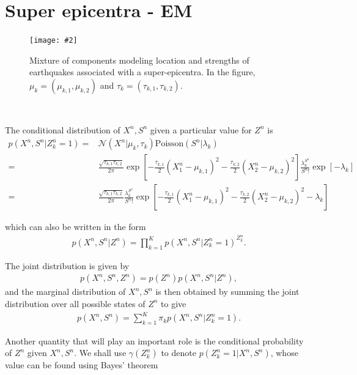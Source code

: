 \documentclass[11pt]{extarticle}
\newcommand{\N}{\mathcal{N}}
\newcommand{\0}{\mathbf{0}}
\renewcommand{\(}{\left(}
\renewcommand{\)}{\right)}
\theoremstyle{definition}
\newcommand{\image}[3]{
	\begin{figure}[!ht]
		\centering
	    \texttt{[image: \#2]}
		\caption{#3}
		\label{fig:#2}
	\end{figure}
}
\begin{document}
\newpage
\section{Super epicentra - EM}
\image{0.5}{Q2_2}{Mixture of components modeling location and strengths of earthquakes associated with a super-epicentra. In the figure, $\mu_{k} = (\mu_{k,1}, \mu_{k,2})$ and $\tau_{k} = (\tau_{k,1}, \tau_{k,2})$.}
\noindent{} \\
\par The conditional distribution of $X^{n}, S^{n}$ given a particular value for $Z^{n}$ is
\begin{align*}
	p(X^{n}, S^{n} \vert Z^{n}_{k}=1) =& \N(X^{n} \vert \mu_{k}, \tau_{k}) \mathrm{Poisson}(S^{n} \vert \lambda_{k}) \\ 
	=& \frac{\sqrt{\tau_{k,1}\tau_{k,2}}}{2\pi} \exp\left[-\frac{\tau_{k,1}}{2}(X^{n}_{1} - \mu_{k,1})^{2} - \frac{\tau_{k,2}}{2}(X^{n}_{2} - \mu_{k,2})^{2}\right] \frac{\lambda_{k}^{S^{n}}}{S^{n}!} \exp\left[-\lambda_{k}\right] \\
	=& \frac{\sqrt{\tau_{k,1}\tau_{k,2}}}{2\pi} \frac{\lambda_{k}^{S^{n}}}{S^{n}!} \exp\left[-\frac{\tau_{k,1}}{2}(X^{n}_{1} - \mu_{k,1})^{2} - \frac{\tau_{k,2}}{2}(X^{n}_{2} - \mu_{k,2})^{2} -\lambda_{k}\right]
\end{align*}
\par which can also be written in the form
\begin{align*}
	p(X^{n}, S^{n} \vert Z^{n}) = \prod_{k=1}^{K} p(X^{n}, S^{n} \vert Z^{n}_{k}=1)^{Z^{n}_{k}}.
\end{align*}
\par The joint distribution is given by
\begin{align*}
	p(X^{n}, S^{n}, Z^{n}) = p(Z^{n}) p(X^{n}, S^{n} \vert Z^{n}),
\end{align*}
and the marginal distribution of $X^{n}, S^{n}$ is then obtained by summing the joint distribution over all possible states of $Z^{n}$ to give
\begin{align*}
	p(X^{n}, S^{n}) = \sum_{k=1}^{K} \pi_{k} p(X^{n}, S^{n} \vert Z^{n}_{k}=1).
\end{align*}
\par Another quantity that will play an important role is the conditional probability of $Z^{n}$ given $X^{n}, S^{n}$. We shall use $\gamma(Z^{n}_{k})$ to denote $p(Z^{n}_{k} = 1 \vert X^{n}, S^{n})$, whose value can be found using Bayes' theorem
\end{document}
